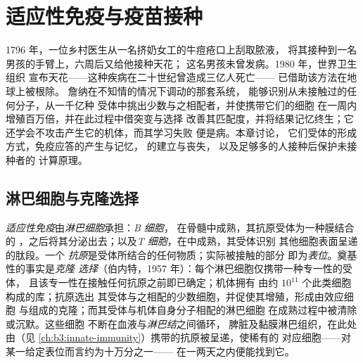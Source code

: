 \chapter{适应性免疫与疫苗接种}\label{ch:b3:adaptive-immunity}

1796 年，一位乡村医生从一名挤奶女工的牛痘疮口上刮取脓液，
将其接种到一名男孩的手臂上，六周后又给他接种天花；
这名男孩未曾发病。1980 年，世界卫生组织
宣布天花——这种疾病在二十世纪曾造成三亿人死亡——
已借助该方法在地球上被根除。
詹纳在不知情的情况下调动的那套系统，
能够识别从未接触过的任何分子，从一千亿种
受体中挑出少数与之相配者，并使携带它们的细胞
在一周内增殖百万倍，并在此过程中借突变与选择
改善其匹配度，并将结果记忆终生；它
还学会不攻击产生它的机体，而其学习失败
便是病。本章讨论，
它们受体的形成方式，免疫应答的产生与记忆，
的建立与丧失，
以及足够多的人接种后保护未接种者的
计算原理。

\section{淋巴细胞与克隆选择}

\begin{definition}[淋巴细胞及其受体]\label{def:b3:adaptive-immunity:lymphocytes}
\emph{适应性免疫}由\emph{淋巴细胞}承担：\emph{B 细胞}，
在骨髓中成熟，其抗原受体为一种膜结合的
\emph{}，之后将其分泌出去；以及\emph{T
细胞}，在中成熟，其受体识别
其他细胞表面呈递的肽段。一个
\emph{抗原}是受体所结合的任何物质；实际被接触的部分
即为\emph{表位}。奠基性的事实是\emph{克隆
选择}（伯内特，1957 年）：每个淋巴细胞仅携带一种专一性的受体，
且该专一性在接触任何抗原之前即已确定；机体拥有
由约 $10^{11}$ 个此类细胞构成的库；抗原选出
其受体与之相配的少数细胞，并促使其增殖，形成由效应细胞
与组成的克隆；而其受体与机体自身分子相配的淋巴细胞
在成熟过程中被清除或沉默。这些细胞
不断在血液与\emph{淋巴结}之间循环，
脾脏及黏膜淋巴组织，在此处由（见
\cref{ch:b3:innate-immunity}）携带的抗原被呈递，使稀有的
对应细胞——对某一给定表位而言约为十万分之一——
在一两天之内便能找到它。
\end{definition}

